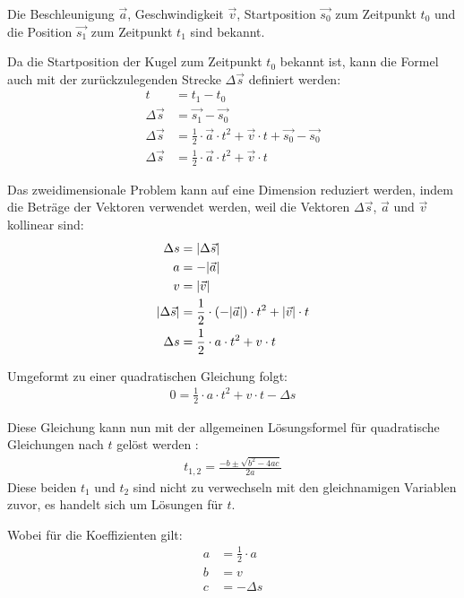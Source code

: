 Die Beschleunigung $\vec{a}$, Geschwindigkeit $\vec{v}$, Startposition $\vec{s_0}$ zum Zeitpunkt $t_0$
und die Position $\vec{s_1}$ zum Zeitpunkt $t_1$ sind bekannt.

Da die Startposition der Kugel zum Zeitpunkt $t_0$ bekannt ist,
kann die Formel auch mit der zurückzulegenden Strecke $\Delta \vec{s}$ definiert werden:
\begin{align}
    t &= t_1 - t_0\\
    \Delta \vec{s} &= \vec{s_1} - \vec{s_0}\\
    \Delta \vec{s} &= \frac{1}{2} \cdot \vec{a} \cdot t^2 + \vec{v} \cdot t + \vec{s_0} - \vec{s_0}\\
    \Delta \vec{s} &= \frac{1}{2} \cdot \vec{a} \cdot t^2 + \vec{v} \cdot t
\end{align}

Das zweidimensionale Problem kann auf eine Dimension reduziert werden, indem die Beträge der Vektoren verwendet werden,
weil die Vektoren $\Delta \vec{s}$, $\vec{a}$ und $\vec{v}$ kollinear sind:
\begin{align}
    \Delta s &= \lvert \Delta \vec{s} \rvert\\
    a &= -\lvert \vec{a} \rvert\\
    v &= \lvert \vec{v} \rvert\\
    \lvert \Delta \vec{s} \rvert &= \frac{1}{2} \cdot (-\lvert \vec{a} \rvert) \cdot t^2 + \lvert \vec{v} \rvert \cdot t\\
    \Delta s &= \frac{1}{2} \cdot a \cdot t^2 + v \cdot t
\end{align}

Umgeformt zu einer quadratischen Gleichung folgt:
\begin{align}
    0 = \frac{1}{2} \cdot a \cdot t^2 + v \cdot t - \Delta s
\end{align}

Diese Gleichung kann nun mit der allgemeinen Lösungsformel für quadratische Gleichungen nach $t$ gelöst werden \cite{wiki.mitternachtsformel:1}:
\begin{align}
    t_{1,2} = \frac{-b \pm \sqrt{b^2 - 4ac}}{2a}
\end{align}
Diese beiden $t_1$ und $t_2$ sind nicht zu verwechseln mit den gleichnamigen Variablen zuvor, es handelt sich um Lösungen für $t$.

Wobei für die Koeffizienten gilt:
\begin{align}
    a &= \frac{1}{2} \cdot a\\
    b &= v\\
    c &= - \Delta s\\
\end{align}

